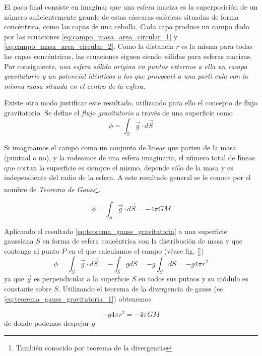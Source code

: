 El paso final consiste en imaginar que una esfera maciza es la superposici\'on de un n\'umero suficientemente grande de estas c\'ascaras esf\'ericas situadas de forma conc\'entrica, como las capas de una cebolla. Cada capa produce un campo dado por las ecuaciones \ref{eq:campo_masa_area_circular_1} y \ref{eq:campo_masa_area_circular_2}. Como la distancia $r$ es la misma para todas las capas conc\'entricas, las ecuaciones siguen siendo v\'alidas para esferas macizas. Por consiguiente, \emph{una esfera s\'olida origina en puntos externos a ella un campo gravitatorio y un potencial id\'enticos a los que provocar\'\i{} a una part\'\i{} cula con la misma masa situada en el centro de la esfera}.

Existe otro modo justificar este resultado, utilizando para ello el concepto de flujo gravitatorio. Se define el \emph{flujo gravitatorio} a trav\'es de una superficie como
\begin{equation}
\phi =\int_S \vec{g} \cdot  d\vec{S}
\label{eq:flujo_gravitatorio}
\end{equation}

Si imaginamos el campo como un conjunto de l\'\i{}neas que parten de la masa (puntual o no), y la rodeamos de una esfera imaginaria, el n\'umero total de l\'\i{}neas que cortan la superficie es siempre el mismo, depende sólo de la masa y es independiente del radio de la esfera. A este resultado general se le conoce por el nombre de \emph{Teorema de Gauss}\footnote{Tambi\'en conocido por teorema de la divergencia}. 

\begin{equation}
\phi =\int_S \vec{g} \cdot  d\vec{S}=-4 \pi G M
\label{eq:teorema_gauss_gravitatoria_1}
\end{equation}

Aplicando el resultado \ref{eq:teorema_gauss_gravitatoria} a una superficie gaussiana $S$ en forma de esfera conc\'entrica con la distribuci\'on de masa y que contenga al punto $P$ en el que calculamos el campo (v\'ease fig. \ref{})
\begin{equation}
\phi =\int_S \vec{g} \cdot  d\vec{S}=-\int_S g dS=-g \int_S  dS= -g 4 \pi r^2
\label{eq:teorema_gauss_gravitatoria_2}
\end{equation}
ya que $\vec{g}$ es perpendicular a la superficie $S$ en todos sus putnos y su m\'odulo es constante sobre $S$. Utilizando el teorema de la divergencia de gauss (ec. \ref{eq:teorema_gauss_gravitatoria_1}) obtenemos

\begin{equation}
 -g 4 \pi r^2=-4 \pi G M
\label{eq:teorema_gauss_gravitatoria_3}
\end{equation}
de donde podemos despejar $g$

